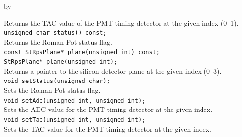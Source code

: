 \documentclass[twoside]{article}
\newcommand{\entrylabel}[1]{\mbox{\textbf{{#1}}}\hfil}%
\newenvironment{entry}
{\begin{list}{}%
    {\renewcommand{\makelabel}{\entrylabel}%
     \setlength{\labelwidth}{90pt}%
     \setlength{\leftmargin}{\labelwidth}
     \advance\leftmargin by \labelsep%
      }%
    }%
  {\end{list}}
\newcommand{\Entrylabel}[1]%
{\raisebox{0pt}[1ex][0pt]{\makebox[\labelwidth][l]%
    {\parbox[t]{\labelwidth}{\hspace{0pt}\textbf{{#1}}}}}}
\newenvironment{Entry}%
{\renewcommand{\entrylabel}{\Entrylabel}\begin{entry}}%
  {\end{entry}}
\begin{document}
\begin{Entry}
    Returns the TAC value of the PMT timing detector at the given index (0--1).\\
    \verb+unsigned char status() const;+\\
    Returns the Roman Pot status flag.\\
    \verb+const StRpsPlane* plane(unsigned int) const;+\\
    \verb+StRpsPlane* plane(unsigned int);+\\
    Returns a pointer to the silicon detector plane at the given index (0--3).\\
    \verb+void setStatus(unsigned char);+\\
    Sets the Roman Pot status flag.\\
    \verb+void setAdc(unsigned int, unsigned int);+\\
    Sets the ADC value for the PMT timing detector at the given index.\\
    \verb+void setTac(unsigned int, unsigned int);+\\
    Sets the TAC value for the PMT timing detector at the given index.\\
\end{Entry}
\clearpage

\end{document}
